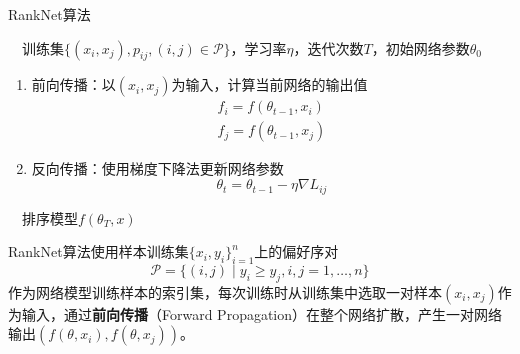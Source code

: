\begin{algorithm}[htbp]
        \caption{RankNet算法}
        \begin{algorithmic}
            \REQUIRE ~~训练集$\{(x_i,x_j),p_{ij},(i,j)\in \mathscr P\}$，学习率$\eta$，迭代次数$T$，初始网络参数$\theta_0$ \\
                \STATE
                \begin{enumerate}
                  \item 前向传播：以$(x_i,x_j)$为输入，计算当前网络的输出值
                  \[
                    \begin{array}{l}
                      f_i=f(\theta_{t-1},x_i) \\
                      f_j=f(\theta_{t-1},x_j)
                    \end{array}
                  \]
                  \item 反向传播：使用梯度下降法更新网络参数
                  \[
                    \theta_t = \theta_{t-1} - \eta \nabla L_{ij}
                  \]
                \end{enumerate}
                \ENDFOR
            \ENDFOR
            \ENSURE ~~排序模型$f(\theta_T,x)$
        \end{algorithmic}
\end{algorithm}

RankNet算法使用样本训练集$\{x_i,y_i\}_{i=1}^n$上的偏好序对
\begin{equation}
    \mathscr P = \{(i,j)\mid y_i \ge y_j, i,j=1,\ldots,n\}
\end{equation}
作为网络模型训练样本的索引集，每次训练时从训练集中选取一对样本$(x_i,x_j)$作为输入，通过\textbf{前向传播}（Forward Propagation）在整个网络扩散，产生一对网络输出$(f(\theta,x_i),f(\theta,x_j))$。

